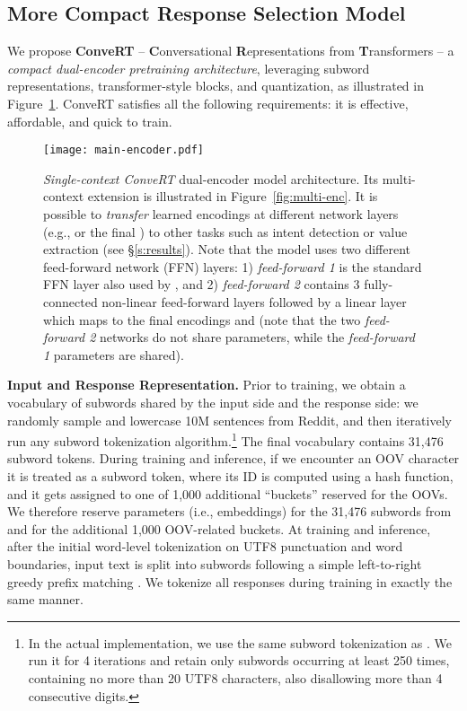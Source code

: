 \documentclass[11pt,a4paper]{article}
\begin{document}
\subsection{More Compact Response Selection Model}
\label{ss:main}
We propose \textbf{ConveRT} -- \textbf{C}onversational \textbf{R}epresentations from \textbf{T}ransformers -- 
a \textit{compact dual-encoder pretraining architecture}, leveraging subword representations, transformer-style blocks, and quantization, as illustrated in Figure~\ref{fig:main-enc}. ConveRT satisfies all the following requirements: it is effective, affordable, and quick to train.



\begin{figure}[!t]
\centering
\texttt{[image: main-encoder.pdf]}
\vspace{-2mm}
\caption{\textit{Single-context ConveRT} dual-encoder model architecture. Its multi-context extension is illustrated in Figure~\ref{fig:multi-enc}. It is possible to \textit{transfer} learned encodings at different network layers (e.g.,  or the final ) to other tasks such as intent detection or value extraction (see \S\ref{s:results}).
Note that the model uses two different feed-forward network (FFN) layers: 1) \textit{feed-forward 1} is the standard FFN layer also used by , and 2) \textit{feed-forward 2} contains 3 fully-connected non-linear feed-forward layers followed by a linear layer which maps to the final encodings  and  (note that the two \textit{feed-forward 2} networks do not share parameters, while the \textit{feed-forward 1} parameters are shared).
}
\vspace{-2.5mm}
\label{fig:main-enc}
\end{figure}



\vspace{1.3mm}
\noindent \textbf{Input and Response Representation.} 
Prior to training, we obtain a vocabulary of subwords  shared by the input side and the response side: we randomly sample and lowercase 10M sentences from Reddit, and then iteratively run any subword tokenization algorithm.\footnote{In the actual implementation, we use the same subword tokenization as . We run it for 4 iterations and retain only subwords occurring at least 250 times, containing no more than 20 UTF8 characters, also disallowing more than 4 consecutive digits.} The final vocabulary  contains 31,476 subword tokens. During training and inference, if we encounter an OOV character it is treated as a subword token, where its ID is computed using a hash function, and it gets assigned to one of 1,000 additional ``buckets'' reserved for the OOVs. We therefore reserve parameters (i.e., embeddings) for the 31,476 subwords from  and for the additional 1,000 OOV-related buckets. At training and inference, after the initial word-level tokenization on UTF8 punctuation and word boundaries, input text  is split into subwords following a simple left-to-right greedy prefix matching \cite{vaswani2018}. We tokenize all responses  during training in exactly the same manner.
\end{document}
